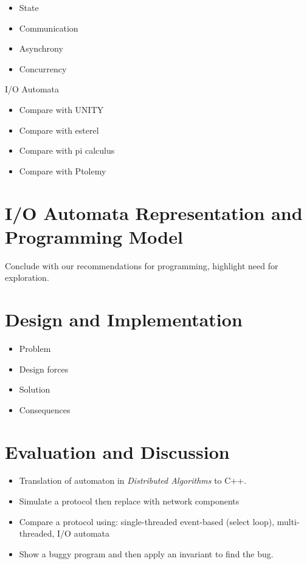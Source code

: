 \documentclass[letterpaper]{article}
\begin{document}
\begin{itemize}
  \item State
  \item Communication
  \item Asynchrony
  \item Concurrency
\end{itemize}

I/O Automata
\begin{itemize}
  \item Compare with UNITY
  \item Compare with esterel
  \item Compare with pi calculus
  \item Compare with Ptolemy
\end{itemize}

\section{I/O Automata Representation and Programming Model\label{programming_model}}

Conclude with our recommendations for programming, highlight need for exploration.

\section{Design and Implementation}

\begin{itemize}
  \item Problem
  \item Design forces
  \item Solution
  \item Consequences
\end{itemize}

\section{Evaluation and Discussion}

\begin{itemize}
\item Translation of automaton in \emph{Distributed Algorithms} to C++.
\item Simulate a protocol then replace with network components
\item Compare a protocol using: single-threaded event-based (select loop), multi-threaded, I/O automata
\item Show a buggy program and then apply an invariant to find the bug.
\end{itemize}
\end{document}
